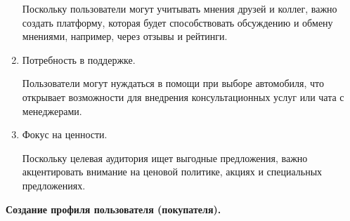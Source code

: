 \begin{enumerate}
    Поскольку пользователи могут учитывать мнения друзей и коллег, важно создать платформу, которая будет способствовать обсуждению и обмену мнениями, например, через отзывы и рейтинги.

    \item Потребность в поддержке.

    Пользователи могут нуждаться в помощи при выборе автомобиля, что открывает возможности для внедрения консультационных услуг или чата с менеджерами.

    \item Фокус на ценности.

    Поскольку целевая аудитория ищет выгодные предложения, важно акцентировать внимание на ценовой политике, акциях и специальных предложениях.
\end{enumerate}
\bigskip

\textbf{Создание профиля пользователя (покупателя).}

\noindent
\begin{minipage}{\linewidth}
\end{minipage}
\bigskip


